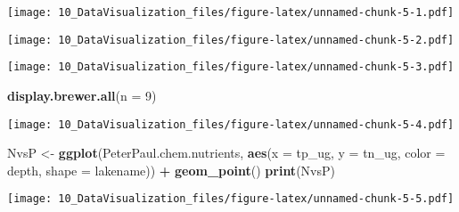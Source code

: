 \documentclass[]{article}
\newenvironment{Shaded}{\begin{snugshade}}{\end{snugshade}}
\newcommand{\KeywordTok}[1]{\textcolor[rgb]{0.13,0.29,0.53}{\textbf{#1}}}
\newcommand{\DataTypeTok}[1]{\textcolor[rgb]{0.13,0.29,0.53}{#1}}
\newcommand{\DecValTok}[1]{\textcolor[rgb]{0.00,0.00,0.81}{#1}}
\newcommand{\StringTok}[1]{\textcolor[rgb]{0.31,0.60,0.02}{#1}}
\newcommand{\OperatorTok}[1]{\textcolor[rgb]{0.81,0.36,0.00}{\textbf{#1}}}
\newcommand{\NormalTok}[1]{#1}
\begin{document}
\texttt{[image: 10\_DataVisualization\_files/figure-latex/unnamed-chunk-5-1.pdf]}

\begin{Shaded}
\end{Shaded}

\texttt{[image: 10\_DataVisualization\_files/figure-latex/unnamed-chunk-5-2.pdf]}

\begin{Shaded}
\end{Shaded}

\texttt{[image: 10\_DataVisualization\_files/figure-latex/unnamed-chunk-5-3.pdf]}

\begin{Shaded}
\begin{Highlighting}[]
\KeywordTok{display.brewer.all}\NormalTok{(}\DataTypeTok{n =} \DecValTok{9}\NormalTok{)}
\end{Highlighting}
\end{Shaded}

\texttt{[image: 10\_DataVisualization\_files/figure-latex/unnamed-chunk-5-4.pdf]}

\begin{Shaded}
\begin{Highlighting}[]
\NormalTok{NvsP <-}
\StringTok{  }\KeywordTok{ggplot}\NormalTok{(PeterPaul.chem.nutrients, }\KeywordTok{aes}\NormalTok{(}\DataTypeTok{x =}\NormalTok{ tp_ug, }\DataTypeTok{y =}\NormalTok{ tn_ug, }\DataTypeTok{color =}\NormalTok{ depth, }\DataTypeTok{shape =}\NormalTok{ lakename)) }\OperatorTok{+}
\StringTok{  }\KeywordTok{geom_point}\NormalTok{() }
\KeywordTok{print}\NormalTok{(NvsP)}
\end{Highlighting}
\end{Shaded}

\texttt{[image: 10\_DataVisualization\_files/figure-latex/unnamed-chunk-5-5.pdf]}
\end{document}
